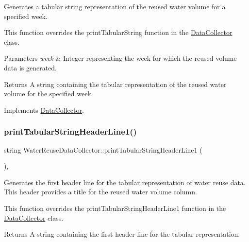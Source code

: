 Generates a tabular string representation of the reused water volume for a specified week. 

This function overrides the {\ttfamily print\+Tabular\+String} function in the {\ttfamily \mbox{\hyperlink{classDataCollector}{Data\+Collector}}} class.


\begin{DoxyParams}{Parameters}
{\em week} & Integer representing the week for which the reused volume data is generated.\\
\hline
\end{DoxyParams}
\begin{DoxyReturn}{Returns}
A string containing the tabular representation of the reused water volume for the specified week. 
\end{DoxyReturn}


Implements \mbox{\hyperlink{classDataCollector_a397fccabe0223267eea8fc7cac0e59da}{Data\+Collector}}.

\mbox{\label{classWaterReuseDataCollector_a1065ad3627b913dccb6ecbf0e6acc6e6}} 
\subsubsection{\texorpdfstring{print\+Tabular\+String\+Header\+Line1()}{printTabularStringHeaderLine1()}}
{\footnotesize\ttfamily string Water\+Reuse\+Data\+Collector\+::print\+Tabular\+String\+Header\+Line1 (\begin{DoxyParamCaption}{ }\end{DoxyParamCaption})\hspace{0.3cm}{\ttfamily [override]}, {\ttfamily [virtual]}}



Generates the first header line for the tabular representation of water reuse data. This header provides a title for the reused water volume column. 

This function overrides the {\ttfamily print\+Tabular\+String\+Header\+Line1} function in the {\ttfamily \mbox{\hyperlink{classDataCollector}{Data\+Collector}}} class.

\begin{DoxyReturn}{Returns}
A string containing the first header line for the tabular representation. 
\end{DoxyReturn}


